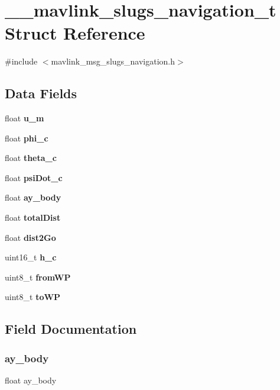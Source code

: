 \section{\+\_\+\+\_\+mavlink\+\_\+slugs\+\_\+navigation\+\_\+t Struct Reference}
\label{struct____mavlink__slugs__navigation__t}


{\ttfamily \#include $<$mavlink\+\_\+msg\+\_\+slugs\+\_\+navigation.\+h$>$}

\subsection*{Data Fields}
\begin{DoxyCompactItemize}
\item 
float \textbf{ u\+\_\+m}
\item 
float \textbf{ phi\+\_\+c}
\item 
float \textbf{ theta\+\_\+c}
\item 
float \textbf{ psi\+Dot\+\_\+c}
\item 
float \textbf{ ay\+\_\+body}
\item 
float \textbf{ total\+Dist}
\item 
float \textbf{ dist2\+Go}
\item 
uint16\+\_\+t \textbf{ h\+\_\+c}
\item 
uint8\+\_\+t \textbf{ from\+WP}
\item 
uint8\+\_\+t \textbf{ to\+WP}
\end{DoxyCompactItemize}


\subsection{Field Documentation}
\mbox{\label{struct____mavlink__slugs__navigation__t_a197d3c3dee40d207d10ddb96b43a62bd}} 
\subsubsection{ay\+\_\+body}
{\footnotesize\ttfamily float ay\+\_\+body}

\mbox{\label{struct____mavlink__slugs__navigation__t_afb4723e1782196a91c70ff0dcd483bc8}} 
